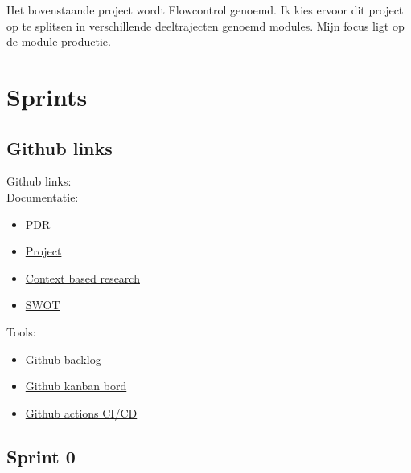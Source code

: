 \documentclass[11pt, twoside]{report}
\begin{document}
    \newline

    Het bovenstaande project wordt Flowcontrol genoemd. Ik kies ervoor dit project op te splitsen in verschillende
    deeltrajecten genoemd modules. Mijn focus ligt op de module productie.

    \newpage

    \chapter{Sprints}
    \label{ch:sprints}

    \section{Github links}\label{sec:github-links}
    Github links: \\
    \newline
    Documentatie:
    \begin{itemize}
        \item \href{https://github.com/rikp777/RP-Flowcontrol/blob/master/documentation/PDR/out/PDR_main.pdf}{PDR}
        \item \href{https://github.com/rikp777/RP-Flowcontrol/blob/master/documentation/project/out/Project_Rik_Peeters.pdf}{Project}
        \item \href{https://github.com/rikp777/RP-Flowcontrol/blob/master/documentation/context_based_research/out/context_based_research_Rik_Peeters.pdf}{Context based research}
        \item \href{https://github.com/rikp777/RP-Flowcontrol/blob/master/documentation/SWOT/out/SWOT_Rik_Peeters.pdf}{SWOT}
    \end{itemize}
    \newline
    Tools:
    \begin{itemize}
        \item \href{https://github.com/rikp777/RP-Flowcontrol/issues}{Github backlog}
        \item \href{https://github.com/rikp777/RP-Flowcontrol/projects/1}{Github kanban bord}
        \item \href{https://github.com/rikp777/RP-Flowcontrol/actions}{Github actions CI/CD}
    \end{itemize}

    \newpage
    \section{Sprint 0}
    \label{sec:sprint-0}
\end{document}
